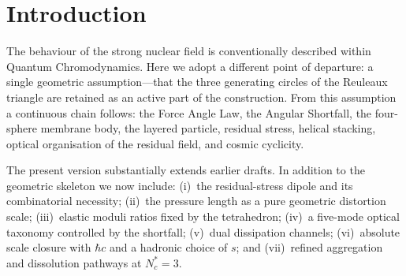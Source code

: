 \section{Introduction}
The behaviour of the strong nuclear field is conventionally described within
Quantum Chromodynamics. Here we adopt a different point of departure: a single
geometric assumption---that the three generating circles of the Reuleaux triangle
are retained as an active part of the construction. From this assumption a
continuous chain follows: the Force Angle Law, the Angular Shortfall, the
four-sphere membrane body, the layered particle, residual stress, helical stacking,
optical organisation of the residual field, and cosmic cyclicity.

The present version substantially extends earlier drafts. In addition to the
geometric skeleton we now include: (i)~the residual-stress dipole and its
combinatorial necessity; (ii)~the pressure length as a pure geometric distortion
scale; (iii)~elastic moduli ratios fixed by the tetrahedron; (iv)~a five-mode
optical taxonomy controlled by the shortfall; (v)~dual dissipation channels;
(vi)~absolute scale closure with $\hbar c$ and a hadronic choice of $s$; and
(vii)~refined aggregation and dissolution pathways at $N_c^*=3$.
